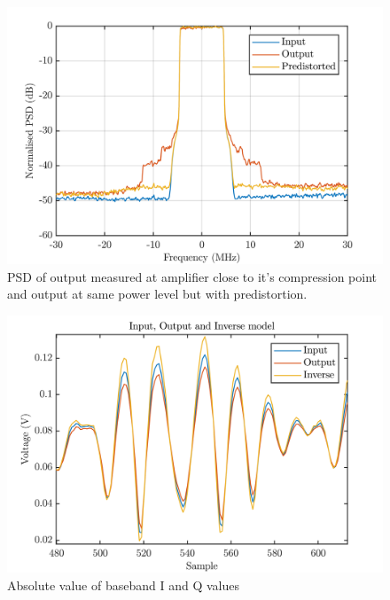 \begin{figure}[H]
\centering 
\includegraphics[scale = 0.7]{figures/measurement/psd_dpd.png}
\caption{PSD of output measured at amplifier close to it's compression point and output at same power level but with predistortion. }
\label{fig:dpd_psd}
\end{figure}

\begin{figure}[H]
\centering 
\includegraphics[scale = 0.7]{figures/measurement/inoutmodel.png}
\caption{Absolute value of baseband I and Q values }
\label{fig:dpd_inout}
\end{figure}



